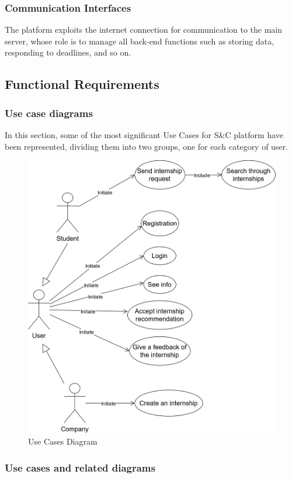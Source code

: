 \subsubsection{Communication Interfaces}
The platform exploits the internet connection for communication to the main server, 
whose role is to manage all back-end functions such as storing data, responding to deadlines, and so on. 


\subsection{Functional Requirements}
\subsubsection{Use case diagrams}
In this section, some of the most significant Use Cases for S\&C platform have been represented, dividing them into two groups, one for each category of user.
\begin{figure}[H]
    \centering
    \includegraphics[width=0.75\linewidth]{Images/UseCasesDiagrams.png}
    \caption{Use Cases Diagram}
    \label{Use Cases Diagram}
\end{figure}\subsubsection{Use cases and related diagrams}

